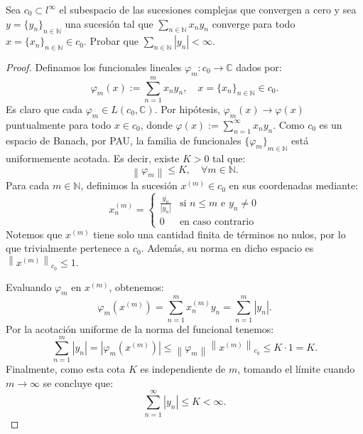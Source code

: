 \documentclass{article}
\theoremstyle{definition}
\newcommand{\N}{\mathbb{N}}
\newcommand{\C}{\mathbb{C}}
\newcommand{\norm}[1]{\left\lVert #1 \right\rVert}       %
\newenvironment{ejercicio}[1]{\begin{trivlist}
\item[\hskip \labelsep {\bfseries Ejercicio}\hskip \labelsep {\bfseries #1.}]}{\end{trivlist}}
\begin{document}
\vspace{0.5cm}

\begin{ejercicio}{15}
    Sea \(c_{0}\subset l^{\infty}\) el subespacio de las sucesiones complejas que convergen a cero y sea \(y={\{y_{n}\}}_{n\in\N}\) una sucesión tal que \(\sum_{n\in\N}x_{n}y_{n}\) converge para todo \(x={\{x_{n}\}}_{n\in\N}\in c_{0}\). Probar que \( \sum_{n\in\N}|y_{n}|<\infty \).
\end{ejercicio}
\begin{proof}
    Definamos los funcionales lineales \( \varphi_m : c_0 \to \C \) dados por:
    \[
        \varphi_m(x) := \sum_{n=1}^{m} x_n y_n, \quad x = {\{x_n\}}_{n\in\N} \in c_0.
    \]
    Es claro que cada \(\varphi_m \in L(c_0, \C)\). Por hipótesis, \(\varphi_m(x) \to \varphi(x)\) puntualmente para todo \(x \in c_0\), donde \(\varphi(x) := \sum_{n=1}^{\infty} x_n y_n\). Como \(c_0\) es un espacio de Banach, por PAU, la familia de funcionales \( {\{\varphi_m\}}_{m\in\N} \) está uniformemente acotada. Es decir, existe \(K > 0\) tal que:
    \[
        \norm{\varphi_m} \leq K, \quad \forall m \in \N.
    \]
    Para cada \( m \in \N \), definimos la sucesión \(x^{(m)} \in c_0\) en sus coordenadas mediante:
    \[
        x^{(m)}_n = \begin{cases}
            \frac{\overline{y_n}}{|y_n|} & \text{si } n \leq m \text{ e } y_n \neq 0 \\
            0                            & \text{en caso contrario}
        \end{cases}
    \]
    Notemos que \(x^{(m)}\) tiene solo una cantidad finita de términos no nulos, por lo que trivialmente pertenece a \(c_0\). Además, su norma en dicho espacio es \(\norm{x^{(m)}}_{c_0} \leq 1\).

    Evaluando \(\varphi_m\) en \(x^{(m)}\), obtenemos:
    \[
        \varphi_m(x^{(m)}) = \sum_{n=1}^{m} x^{(m)}_n y_n = \sum_{n=1}^{m} |y_n|.
    \]
    Por la acotación uniforme de la norma del funcional tenemos:
    \[
        \sum_{n=1}^{m} |y_n| = |\varphi_m(x^{(m)})| \leq \norm{\varphi_m} \norm{x^{(m)}}_{c_0} \leq K \cdot 1 = K.
    \]
    Finalmente, como esta cota \(K\) es independiente de \(m\), tomando el límite cuando \(m \to \infty\) se concluye que:
    \[
        \sum_{n=1}^{\infty} |y_n| \leq K < \infty.
    \]
\end{proof}

\vspace{0.5cm}
\end{document}
